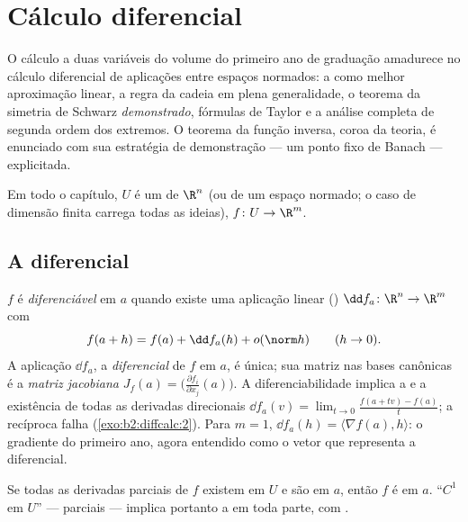 \chapter{Cálculo diferencial}\label{ch:b2:diffcalc}

O cálculo a duas variáveis do volume do primeiro ano de graduação amadurece no
cálculo diferencial de aplicações entre espaços normados: a
\emph{} como melhor aproximação linear, a regra da cadeia
em plena generalidade, o teorema da simetria de Schwarz \emph{demonstrado}, fórmulas
de Taylor e a análise completa de segunda ordem dos extremos. O
teorema da função inversa, coroa da teoria, é enunciado com sua
estratégia de demonstração --- um ponto fixo de Banach --- explicitada.

Em todo o capítulo, $U$ é um  de $\R^n$ (ou de um espaço normado; o
caso de dimensão finita carrega todas as ideias), $f \colon U \to
\R^m$.

\section{A diferencial}

\begin{definition}\label{def:b2:diffcalc:differential}
$f$ é \emph{diferenciável} em $a$ quando existe
uma aplicação linear () $\dd f_a \colon \R^n \to \R^m$ com
\[
f(a + h) = f(a) + \dd f_a(h) + o(\norm h)
\qquad (h \to 0).
\]
A aplicação $\dd f_a$, a \emph{diferencial} de
$f$ em $a$, é única; sua matriz nas bases canônicas é
a \emph{matriz jacobiana} $J_f(a) =
\bigl(\frac{\partial f_i}{\partial x_j}(a)\bigr)$.
A diferenciabilidade implica a  e a existência de todas as
derivadas direcionais $\dd f_a(v) = \lim_{t\to0}\frac{f(a + tv)
- f(a)}{t}$; a recíproca falha
(\cref{exo:b2:diffcalc:2}). Para $m = 1$, $\dd f_a(h) = \langle
\nabla f(a), h\rangle$: o gradiente do primeiro ano, agora entendido como
o vetor que representa a diferencial.
\end{definition}

\begin{theorem}[Critério $C^1$]\label{thm:b2:diffcalc:c1}
Se todas as derivadas parciais de $f$ existem em $U$ e são 
em $a$, então $f$ é  em $a$. ``$C^1$ em $U$'' ---
parciais  --- implica portanto a 
em toda parte, com  .
\end{theorem}

